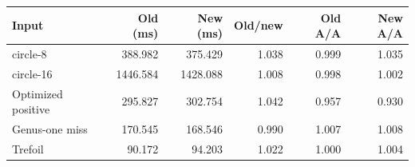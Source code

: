 \begin{tabular}{lrrrrr}
\toprule
Input & Old (ms) & New (ms) & Old/new & Old A/A & New A/A \\
\midrule
circle-8 & 388.982 & 375.429 & 1.038 & 0.999 & 1.035 \\
circle-16 & 1446.584 & 1428.088 & 1.008 & 0.998 & 1.002 \\
Optimized positive & 295.827 & 302.754 & 1.042 & 0.957 & 0.930 \\
Genus-one miss & 170.545 & 168.546 & 0.990 & 1.007 & 1.008 \\
Trefoil & 90.172 & 94.203 & 1.022 & 1.000 & 1.004 \\
\bottomrule
\end{tabular}
